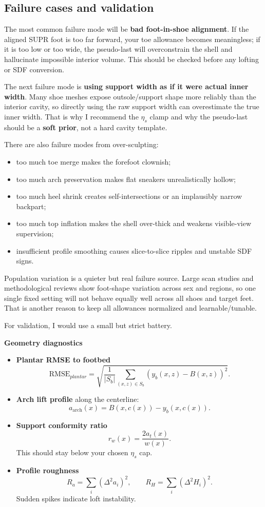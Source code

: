 \documentclass[
  10.5pt,
]{article}
\providecommand{\tightlist}{%
  \setlength{\itemsep}{0pt}\setlength{\parskip}{0pt}}
\begin{document}
\subsection{Failure cases and
validation}\label{failure-cases-and-validation}

The most common failure mode will be \textbf{bad foot-in-shoe
alignment}. If the aligned SUPR foot is too far forward, your toe
allowance becomes meaningless; if it is too low or too wide, the
pseudo-last will overconstrain the shell and hallucinate impossible
interior volume. This should be checked before any lofting or SDF
conversion.

The next failure mode is \textbf{using support width as if it were
actual inner width}. Many shoe meshes expose outsole/support shape more
reliably than the interior cavity, so directly using the raw support
width can overestimate the true inner width. That is why I recommend the
\(\eta_s\) clamp and why the pseudo-last should be a \textbf{soft
prior}, not a hard cavity template.

There are also failure modes from over-sculpting:

\begin{itemize}
\tightlist
\item
  too much toe merge makes the forefoot clownish;
\item
  too much arch preservation makes flat sneakers unrealistically hollow;
\item
  too much heel shrink creates self-intersections or an implausibly
  narrow backpart;
\item
  too much top inflation makes the shell over-thick and weakens
  visible-view supervision;
\item
  insufficient profile smoothing causes slice-to-slice ripples and
  unstable SDF signs.
\end{itemize}

Population variation is a quieter but real failure source. Large scan
studies and methodological reviews show foot-shape variation across sex
and regions, so one single fixed setting will not behave equally well
across all shoes and target feet. That is another reason to keep all
allowances normalized and learnable/tunable.

For validation, I would use a small but strict battery.

\textbf{Geometry diagnostics}

\begin{itemize}
\tightlist
\item
  \textbf{Plantar RMSE to footbed} \[
  \mathrm{RMSE}_{plantar}
  =
  \sqrt{
  \frac{1}{|S_b|}
  \sum_{(x,z)\in S_b}
  \left(y_b(x,z)-B(x,z)\right)^2
  }.
  \]
\item
  \textbf{Arch lift profile} along the centerline: \[
  a_{\text{arch}}(x)=B(x,c(x))-y_b(x,c(x)).
  \]
\item
  \textbf{Support conformity ratio} \[
  r_w(x)=\frac{2a_t(x)}{w(x)}.
  \] This should stay below your chosen \(\eta_s\) cap.
\item
  \textbf{Profile roughness} \[
  R_a=\sum_i (\Delta^2 a_i)^2,\qquad
  R_H=\sum_i (\Delta^2 H_i)^2.
  \] Sudden spikes indicate loft instability.
\end{itemize}
\end{document}
